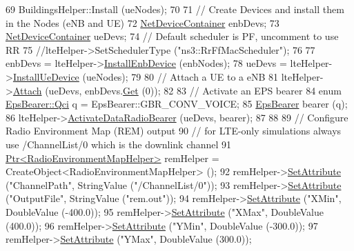 \begin{DoxyCode}
69   BuildingsHelper::Install (ueNodes);
70 
71   \textcolor{comment}{// Create Devices and install them in the Nodes (eNB and UE)}
72   \hyperlink{classns3_1_1NetDeviceContainer}{NetDeviceContainer} enbDevs;
73   \hyperlink{classns3_1_1NetDeviceContainer}{NetDeviceContainer} ueDevs;
74   \textcolor{comment}{// Default scheduler is PF, uncomment to use RR}
75   \textcolor{comment}{//lteHelper->SetSchedulerType ("ns3::RrFfMacScheduler");}
76 
77   enbDevs = lteHelper->\hyperlink{classns3_1_1LteHelper_a5e009ad35ef85f46b5a6099263f15a03}{InstallEnbDevice} (enbNodes);
78   ueDevs = lteHelper->\hyperlink{classns3_1_1LteHelper_ac9cd932d7de92811cfa953c2e3b2fc9f}{InstallUeDevice} (ueNodes);
79 
80   \textcolor{comment}{// Attach a UE to a eNB}
81   lteHelper->\hyperlink{classns3_1_1LteHelper_a9466743f826aa2652a87907b7f0a1c87}{Attach} (ueDevs, enbDevs.\hyperlink{classns3_1_1NetDeviceContainer_a677d62594b5c9d2dea155cc5045f4d0b}{Get} (0));
82 
83   \textcolor{comment}{// Activate an EPS bearer}
84   \textcolor{keyword}{enum} \hyperlink{structns3_1_1EpsBearer_aecf0c67109c5eb4ec0b07226fff5885e}{EpsBearer::Qci} q = EpsBearer::GBR\_CONV\_VOICE;
85   \hyperlink{structns3_1_1EpsBearer}{EpsBearer} bearer (q);
86   lteHelper->\hyperlink{classns3_1_1LteHelper_ac896e16cf162e4beeaa292d39ab1b700}{ActivateDataRadioBearer} (ueDevs, bearer);
87 
88 
89   \textcolor{comment}{// Configure Radio Environment Map (REM) output}
90   \textcolor{comment}{// for LTE-only simulations always use /ChannelList/0 which is the downlink channel}
91   \hyperlink{classns3_1_1Ptr}{Ptr<RadioEnvironmentMapHelper>} remHelper = 
      CreateObject<RadioEnvironmentMapHelper> ();
92   remHelper->\hyperlink{classns3_1_1ObjectBase_ac60245d3ea4123bbc9b1d391f1f6592f}{SetAttribute} (\textcolor{stringliteral}{"ChannelPath"}, StringValue (\textcolor{stringliteral}{"/ChannelList/0"}));
93   remHelper->\hyperlink{classns3_1_1ObjectBase_ac60245d3ea4123bbc9b1d391f1f6592f}{SetAttribute} (\textcolor{stringliteral}{"OutputFile"}, StringValue (\textcolor{stringliteral}{"rem.out"}));
94   remHelper->\hyperlink{classns3_1_1ObjectBase_ac60245d3ea4123bbc9b1d391f1f6592f}{SetAttribute} (\textcolor{stringliteral}{"XMin"}, DoubleValue (-400.0));
95   remHelper->\hyperlink{classns3_1_1ObjectBase_ac60245d3ea4123bbc9b1d391f1f6592f}{SetAttribute} (\textcolor{stringliteral}{"XMax"}, DoubleValue (400.0));
96   remHelper->\hyperlink{classns3_1_1ObjectBase_ac60245d3ea4123bbc9b1d391f1f6592f}{SetAttribute} (\textcolor{stringliteral}{"YMin"}, DoubleValue (-300.0));
97   remHelper->\hyperlink{classns3_1_1ObjectBase_ac60245d3ea4123bbc9b1d391f1f6592f}{SetAttribute} (\textcolor{stringliteral}{"YMax"}, DoubleValue (300.0));

\end{DoxyCode}
